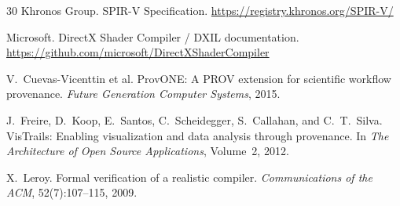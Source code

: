 \documentclass[sigconf,nonacm]{acmart}
\begin{document}
\begin{thebibliography}{30}
Khronos Group.
\newblock SPIR-V Specification.
\newblock \url{https://registry.khronos.org/SPIR-V/}

Microsoft.
\newblock DirectX Shader Compiler / DXIL documentation.
\newblock \url{https://github.com/microsoft/DirectXShaderCompiler}

V.~Cuevas-Vicenttin et al.
\newblock ProvONE: A PROV extension for scientific workflow provenance.
\newblock \emph{Future Generation Computer Systems}, 2015.

J.~Freire, D.~Koop, E.~Santos, C.~Scheidegger, S.~Callahan, and C.~T.~Silva.
\newblock VisTrails: Enabling visualization and data analysis through provenance.
\newblock In \emph{The Architecture of Open Source Applications}, Volume~2, 2012.

X.~Leroy.
\newblock Formal verification of a realistic compiler.
\newblock \emph{Communications of the ACM}, 52(7):107--115, 2009.

\end{thebibliography}
\fi
\end{document}
